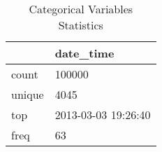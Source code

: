 \begin{table}
\caption{Categorical Variables Statistics}
\label{tab:categorical_stats}
\begin{tabular}{ll}
\toprule
 & date\_time \\
\midrule
count & 100000 \\
unique & 4045 \\
top & 2013-03-03 19:26:40 \\
freq & 63 \\
\bottomrule
\end{tabular}
\end{table}
